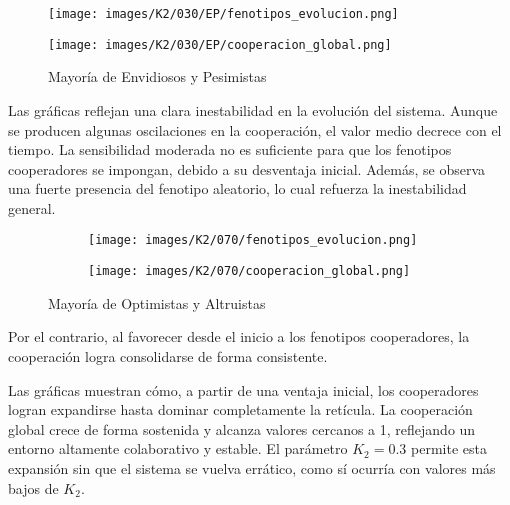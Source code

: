 \documentclass[a4paper,12pt]{report}
\begin{document}
\begin{figure}[h]
    \centering
    \begin{minipage}{0.49\textwidth}
    \centering
    \texttt{[image: images/K2/030/EP/fenotipos\_evolucion.png]}
    \label{fig:enter-label}
    \end{minipage}
    \hfill
    \begin{minipage}{0.49\textwidth}
    \centering
    \texttt{[image: images/K2/030/EP/cooperacion\_global.png]}
    \label{fig:enter-label}
    \end{minipage}
    \caption{Mayoría de Envidiosos y Pesimistas}
\end{figure}

Las gráficas reflejan una clara inestabilidad en la evolución del sistema. Aunque se producen algunas oscilaciones en la cooperación, el valor medio decrece con el tiempo. La sensibilidad moderada no es suficiente para que los fenotipos cooperadores se impongan, debido a su desventaja inicial. Además, se observa una fuerte presencia del fenotipo aleatorio, lo cual refuerza la inestabilidad general.

\begin{figure}[!h]
    \centering
    \begin{subfigure}[t]{0.49\textwidth}
        \centering
        \texttt{[image: images/K2/070/fenotipos\_evolucion.png]}
        \label{fig:enter-label}
    \end{subfigure}
    \hfill
    \begin{subfigure}[t]{0.49\textwidth}
        \centering
        \texttt{[image: images/K2/070/cooperacion\_global.png]}
        \label{fig:enter-label}
    \end{subfigure}
    \caption{Mayoría de Optimistas y Altruistas}
\end{figure}

Por el contrario, al favorecer desde el inicio a los fenotipos cooperadores, la cooperación logra consolidarse de forma consistente.

Las gráficas muestran cómo, a partir de una ventaja inicial, los cooperadores logran expandirse hasta dominar completamente la retícula. La cooperación global crece de forma sostenida y alcanza valores cercanos a 1, reflejando un entorno altamente colaborativo y estable. El parámetro \( K_2 = 0.3 \) permite esta expansión sin que el sistema se vuelva errático, como sí ocurría con valores más bajos de \( K_2 \).
\end{document}

